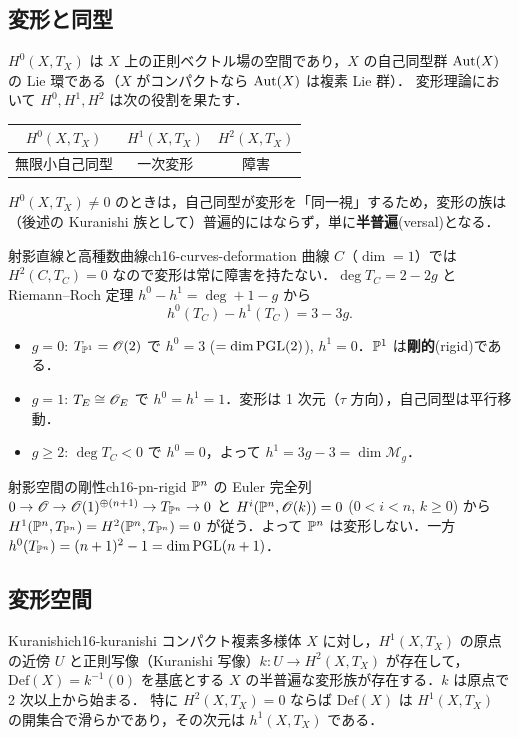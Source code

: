 \subsection{変形と同型}

$H^0(X,T_X)$ は $X$ 上の正則ベクトル場の空間であり，$X$ の自己同型群 $\operatorname{Aut}(X)$ の Lie 環である（$X$ がコンパクトなら $\operatorname{Aut}(X)$ は複素 Lie 群）．
変形理論において $H^0,H^1,H^2$ は次の役割を果たす．
\begin{center}
\begin{tabular}{ccc}
\hline
$H^0(X,T_X)$ & $H^1(X,T_X)$ & $H^2(X,T_X)$\\
\hline
無限小自己同型 & 一次変形 & 障害\\
\hline
\end{tabular}
\end{center}
$H^0(X,T_X)\neq0$ のときは，自己同型が変形を「同一視」するため，変形の族は（後述の Kuranishi 族として）普遍的にはならず，単に\textbf{半普遍}(versal)となる．

\begin{myex}{射影直線と高種数曲線}{ch16-curves-deformation}
曲線 $C$（$\dim=1$）では $H^2(C,T_C)=0$ なので変形は常に障害を持たない．$\deg T_C=2-2g$ と Riemann--Roch 定理 $h^0-h^1=\deg+1-g$ から
\[
h^0(T_C)-h^1(T_C)=3-3g .
\]
\begin{itemize}
\item $g=0$: $T_{\mathbb{P}^1}=\mathscr{O}(2)$ で $h^0=3$ ($=\dim\operatorname{PGL}(2)$), $h^1=0$．$\mathbb{P}^1$ は\textbf{剛的}(rigid)である．
\item $g=1$: $T_E\cong\mathscr{O}_E$ で $h^0=h^1=1$．変形は 1 次元（$\tau$ 方向），自己同型は平行移動．
\item $g\ge2$: $\deg T_C<0$ で $h^0=0$，よって $h^1=3g-3=\dim\mathcal{M}_g$．
\end{itemize}
\end{myex}

\begin{myex}{射影空間の剛性}{ch16-pn-rigid}
$\mathbb{P}^n$ の Euler 完全列 $0\to\mathscr{O}\to\mathscr{O}(1)^{\oplus(n+1)}\to T_{\mathbb{P}^n}\to0$ と $H^i(\mathbb{P}^n,\mathscr{O}(k))=0$ ($0<i<n$, $k\ge 0$) から $H^1(\mathbb{P}^n,T_{\mathbb{P}^n})=H^2(\mathbb{P}^n,T_{\mathbb{P}^n})=0$ が従う．よって $\mathbb{P}^n$ は変形しない．一方 $h^0(T_{\mathbb{P}^n})=(n+1)^2-1=\dim\operatorname{PGL}(n+1)$．
\end{myex}

\subsection{変形空間}

\begin{mythm}{Kuranishi}{ch16-kuranishi}
コンパクト複素多様体 $X$ に対し，$H^1(X,T_X)$ の原点の近傍 $U$ と正則写像（Kuranishi 写像）$k:U\to H^2(X,T_X)$ が存在して，$\mathrm{Def}(X)=k^{-1}(0)$ を基底とする $X$ の半普遍な変形族が存在する．$k$ は原点で 2 次以上から始まる．
特に $H^2(X,T_X)=0$ ならば $\mathrm{Def}(X)$ は $H^1(X,T_X)$ の開集合で滑らかであり，その次元は $h^1(X,T_X)$ である．
\end{mythm}

